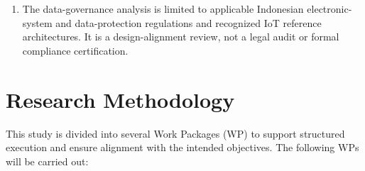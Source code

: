 \begin{enumerate}
    \item The data-governance analysis is limited to applicable Indonesian electronic-system and data-protection regulations and recognized IoT reference architectures. It is a design-alignment review, not a legal audit or formal compliance certification.
\end{enumerate}



\section{Research Methodology}
This study is divided into several Work Packages (WP) to support structured execution and ensure alignment with the intended objectives. The following WPs will be carried out:

